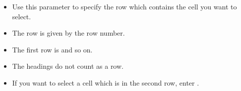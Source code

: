     \begin{itemize}
\item Use this parameter to specify the row which contains the cell you want to select.
\item The row is given by the row number.
\item The first row is  and so on.
\item The headings do not count as a row. 
\item If you want to select a cell which is in the second row, enter . 
\end{itemize}    